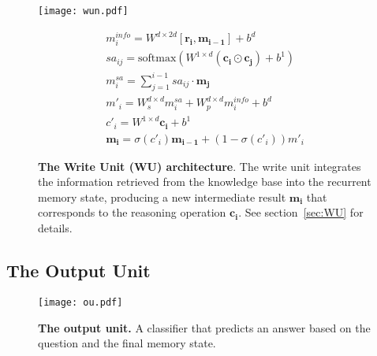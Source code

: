 \documentclass[fleqn]{article}
\newcommand{\secref}[1]{section~\ref{sec:#1}}
\begin{document}
\begin{figure}[t]
\centering
\begin{minipage}{0.54\textwidth}
\noindent
\vspace*{-4pt}
\hspace*{-16pt}
\texttt{[image: wun.pdf]}
\end{minipage}
\hspace*{-42pt}
\begin{minipage}{0.55\textwidth}
\noindent
\footnotesize
\begin{subequations}
\begin{gather}
m_i^{info} = {W}^{d\times 2d}[\boldsymbol{r_{i}},\boldsymbol{m_{i-1}}] + {b}^d\tag{w1} \\[1pt]
{\mathit{sa}_{ij}} = \textrm{softmax}\left({W}^{1\times d}{\left( \boldsymbol{c_i} \odot \boldsymbol{c_j} \right)} + {b^1} \right)\tag{w2.1} \\[-3pt]
{m_i^{sa}} = \sum\limits_{j = 1}^{i - 1} {\mathit{sa}_{ij}} \cdot \boldsymbol{{m}_{j}}\tag{w2.2} \\[1pt]
{m'_i} = {W_s^{d\times d}}{m_i^{sa}} + {W_p^{d\times d}} m_i^{info} + b^d\tag{w2.3} \\[4pt]
{c'_i} = W^{1\times d}\boldsymbol{c_i} + b^1\tag{w3.1} \\[2pt]
\boldsymbol{m_i} = \sigma \left( {{c'_i}} \right)  \boldsymbol{m_{i - 1}} + \left( {1 - \sigma \left( {{c'_i}} \right)} \right){m'_i}\tag{w3.2} 
\end{gather}
\end{subequations}
\end{minipage}

\caption{\textbf{The Write Unit (WU) architecture}. The write unit integrates the information retrieved from the knowledge base into the recurrent memory state, producing a new intermediate result \(\boldsymbol{m_i}\) that corresponds to the reasoning operation \(\boldsymbol{c_i}\). See \secref{WU} for details. }\label{fig:write}
\end{figure}

\subsection{The Output Unit}
\label{sec:output}

\begin{wrapfigure}[8]{r}{0.36\textwidth}
\centering
\vspace{-5mm}
\centering
\texttt{[image: ou.pdf]}

\vspace{-0.5mm}

\caption{\textbf{The output unit.} A classifier that predicts an answer based on the question and the final memory state.}

\end{wrapfigure}
\end{document}
